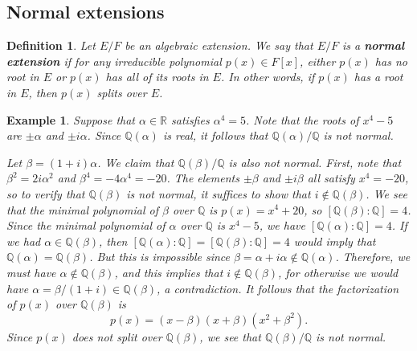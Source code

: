 \documentclass[10pt]{article}
\newcommand{\R}{\mathbb{R}}
\newcommand{\Q}{\mathbb{Q}}
\theoremstyle{newstyle}
\newtheorem{defn}[thm]{Definition}
\newtheorem{exmp}[thm]{Example}
\begin{document}
\subsection{Normal extensions}

\begin{defn}
Let $E/F$ be an algebraic extension. We say that $E/F$ is a \textbf{normal extension} if for 
any irreducible polynomial $p(x) \in F[x]$, either $p(x)$ has no root in $E$ or 
$p(x)$ has all of its roots in $E$. In other words, if $p(x)$ has a root in $E$, then 
$p(x)$ splits over $E$.
\end{defn}

\begin{exmp}
Suppose that $\alpha \in \R$ satisfies $\alpha^4 = 5$. Note that the roots of $x^4 - 5$ are 
$\pm \alpha$ and $\pm i\alpha$. Since $\Q(\alpha)$ is real, it follows that $\Q(\alpha)/\Q$ is 
not normal. 

Let $\beta = (1+i)\alpha$. We claim that $\Q(\beta)/\Q$ is also not normal. First, note that 
$\beta^2 = 2i\alpha^2$ and $\beta^4 = -4\alpha^4 = -20$. The elements $\pm\beta$ and 
$\pm i\beta$ all satisfy $x^4 = -20$, so to verify that $\Q(\beta)$ is not normal, 
it suffices to show that $i \notin \Q(\beta)$. We see that the minimal polynomial of 
$\beta$ over $\Q$ is $p(x) = x^4 + 20$, so $[\Q(\beta) : \Q] = 4$. Since the minimal polynomial 
of $\alpha$ over $\Q$ is $x^4 - 5$, we have $[\Q(\alpha) : \Q] = 4$. If we had 
$\alpha \in \Q(\beta)$, then $[\Q(\alpha) : \Q] = [\Q(\beta) : \Q] = 4$ would imply 
that $\Q(\alpha) = \Q(\beta)$. But this is impossible since $\beta = \alpha + i\alpha \notin 
\Q(\alpha)$. Therefore, we must have $\alpha \notin \Q(\beta)$, and this implies that 
$i \notin \Q(\beta)$, for otherwise we would have $\alpha = \beta/(1+i) \in \Q(\beta)$, 
a contradiction. It follows that the factorization of $p(x)$ over $\Q(\beta)$ is 
\[ p(x) = (x-\beta)(x+\beta)(x^2+\beta^2). \]
Since $p(x)$ does not split over $\Q(\beta)$, we see that $\Q(\beta)/\Q$ is not normal. 
\end{exmp}
\end{document}
